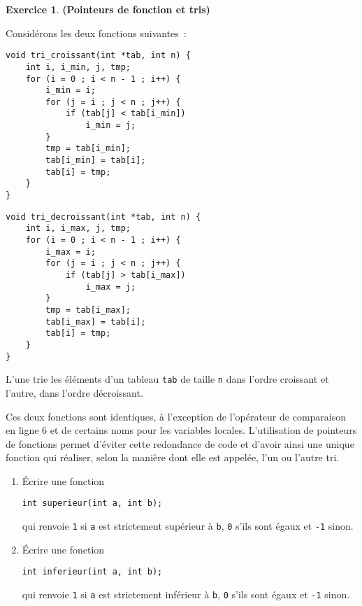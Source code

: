 \documentclass[12pt]{article}
\theoremstyle{definition}
\newtheorem{Exercice}{Exercice}
\begin{document}
\begin{Exercice} {\bf (Pointeurs de fonction et tris)}\smallskip
\label{ex:pointeurs_de_fonction_et_tris}

Considérons les deux fonctions suivantes~:
\begin{multicols}{2}
\begin{lstlisting}
void tri_croissant(int *tab, int n) {
    int i, i_min, j, tmp;
    for (i = 0 ; i < n - 1 ; i++) {
        i_min = i;
        for (j = i ; j < n ; j++) {
            if (tab[j] < tab[i_min])
                i_min = j;
        }
        tmp = tab[i_min];
        tab[i_min] = tab[i];
        tab[i] = tmp;
    }
}
\end{lstlisting}
\begin{lstlisting}
void tri_decroissant(int *tab, int n) {
    int i, i_max, j, tmp;
    for (i = 0 ; i < n - 1 ; i++) {
        i_max = i;
        for (j = i ; j < n ; j++) {
            if (tab[j] > tab[i_max])
                i_max = j;
        }
        tmp = tab[i_max];
        tab[i_max] = tab[i];
        tab[i] = tmp;
    }
}
\end{lstlisting}
\end{multicols}
L'une trie les éléments d'un tableau {\tt tab} de taille {\tt n} dans
l'ordre croissant et l'autre, dans l'ordre décroissant.
\smallskip

Ces deux fonctions sont identiques, à l'exception de l'opérateur de
comparaison en ligne 6 et de certains noms pour les variables locales.
L'utilisation de pointeurs de fonctions permet d'éviter cette redondance
de code et d'avoir ainsi une unique fonction qui réaliser, selon la
manière dont elle est appelée, l'un ou l'autre tri.
\begin{enumerate}
    \item Écrire une fonction
\begin{lstlisting}
int superieur(int a, int b);
\end{lstlisting}
    qui renvoie {\tt 1} si {\tt a} est strictement supérieur à {\tt b},
    {\tt 0} s'ils sont égaux et {\tt -1} sinon.
    \smallskip

    \item Écrire une fonction
\begin{lstlisting}
int inferieur(int a, int b);
\end{lstlisting}
    qui renvoie {\tt 1} si {\tt a} est strictement inférieur à {\tt b},
    {\tt 0} s'ils sont égaux et {\tt -1} sinon.
    \smallskip


\end{enumerate}
\end{Exercice}
\end{document}
